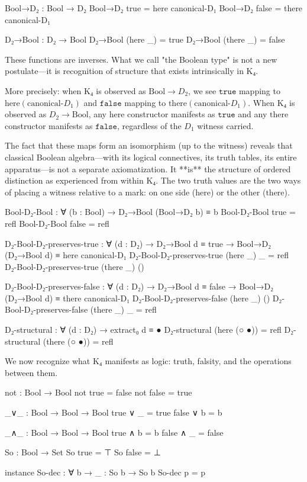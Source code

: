 \documentclass[11pt,a4paper]{book}
\begin{document}
\begin{code}
Bool→D₂ : Bool → D₂
Bool→D₂ true  = here canonical-D₁
Bool→D₂ false = there canonical-D₁

D₂→Bool : D₂ → Bool
D₂→Bool (here _)  = true
D₂→Bool (there _) = false
\end{code}

These functions are inverses. What we call "the Boolean type" is not a new postulate—it 
is recognition of structure that exists intrinsically in K₄.

More precisely: when K₄ is observed as $\text{Bool} \to D_2$, we see $\texttt{true}$ mapping to 
$\text{here}(\text{canonical-}D_1)$ and $\texttt{false}$ mapping to $\text{there}(\text{canonical-}D_1)$. 
When K₄ is observed as $D_2 \to \text{Bool}$, any $\text{here}$ constructor manifests as 
$\texttt{true}$ and any $\text{there}$ constructor manifests as $\texttt{false}$, regardless 
of the $D_1$ witness carried.

The fact that these maps form an isomorphism (up to the witness) reveals that 
classical Boolean algebra—with its logical connectives, its truth tables, its 
entire apparatus—is not a separate axiomatization. It **is** the structure 
of ordered distinction as experienced from within K₄. The two truth values are the two ways of placing a witness 
relative to a mark: on one side ($\text{here}$) or the other ($\text{there}$).

\begin{code}
Bool-D₂-Bool : ∀ (b : Bool) → D₂→Bool (Bool→D₂ b) ≡ b
Bool-D₂-Bool true  = refl
Bool-D₂-Bool false = refl

D₂-Bool-D₂-preserves-true : ∀ (d : D₂) → D₂→Bool d ≡ true → 
  Bool→D₂ (D₂→Bool d) ≡ here canonical-D₁
D₂-Bool-D₂-preserves-true (here _) _ = refl
D₂-Bool-D₂-preserves-true (there _) ()

D₂-Bool-D₂-preserves-false : ∀ (d : D₂) → D₂→Bool d ≡ false → 
  Bool→D₂ (D₂→Bool d) ≡ there canonical-D₁
D₂-Bool-D₂-preserves-false (here _) ()
D₂-Bool-D₂-preserves-false (there _) _ = refl

D₂-structural : ∀ (d : D₂) → extract₀ d ≡ ●
D₂-structural (here (○ ●))  = refl
D₂-structural (there (○ ●)) = refl
\end{code}

We now recognize what K₄ manifests as logic: truth, falsity, and the operations 
between them.

\begin{code}
not : Bool → Bool
not true = false
not false = true

_∨_ : Bool → Bool → Bool
true  ∨ _ = true
false ∨ b = b

_∧_ : Bool → Bool → Bool
true ∧ b = b
false ∧ _ = false

So : Bool → Set
So true  = ⊤
So false = ⊥

instance
  So-dec : ∀ {b} → {{_ : So b}} → So b
  So-dec {{p}} = p
\end{code}
\end{document}
